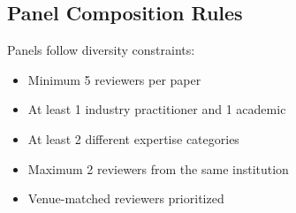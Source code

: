 \subsection{Panel Composition Rules}

Panels follow diversity constraints:
\begin{itemize}
    \item Minimum 5 reviewers per paper
    \item At least 1 industry practitioner and 1 academic
    \item At least 2 different expertise categories
    \item Maximum 2 reviewers from the same institution
    \item Venue-matched reviewers prioritized
\end{itemize}
